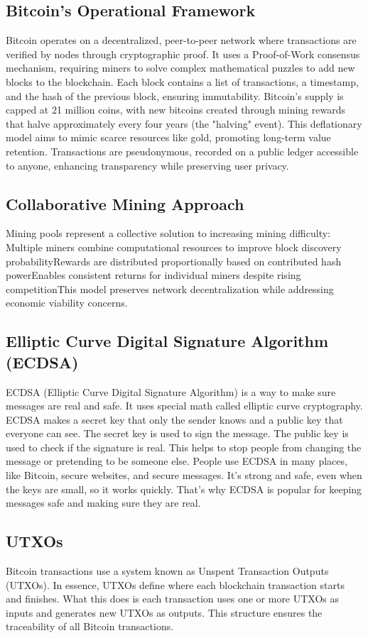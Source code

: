 \documentclass[12pt, a4paper]{article}
\begin{document}
\subsection{Bitcoin's Operational Framework}
Bitcoin operates on a decentralized, peer-to-peer network where transactions are verified by nodes through cryptographic proof. It uses a Proof-of-Work consensus mechanism, requiring miners to solve complex mathematical puzzles to add new blocks to the blockchain. Each block contains a list of transactions, a timestamp, and the hash of the previous block, ensuring immutability. Bitcoin's supply is capped at 21 million coins, with new bitcoins created through mining rewards that halve approximately every four years (the "halving" event). This deflationary model aims to mimic scarce resources like gold, promoting long-term value retention. Transactions are pseudonymous, recorded on a public ledger accessible to anyone, enhancing transparency while preserving user privacy.
\subsection{Collaborative Mining Approach}
Mining pools represent a collective solution to increasing mining difficulty:
Multiple miners combine computational resources to improve block discovery probabilityRewards are distributed proportionally based on contributed hash powerEnables consistent returns for individual miners despite rising competitionThis model preserves network decentralization while addressing economic viability concerns.
\subsection{Elliptic Curve Digital Signature Algorithm (ECDSA)}
ECDSA (Elliptic Curve Digital Signature Algorithm) is a way to make sure messages are real and safe. It uses special math called elliptic curve cryptography. ECDSA makes a secret key that only the sender knows and a public key that everyone can see. The secret key is used to sign the message. The public key is used to check if the signature is real. This helps to stop people from changing the message or pretending to be someone else. People use ECDSA in many places, like Bitcoin, secure websites, and secure messages. It’s strong and safe, even when the keys are small, so it works quickly. That’s why ECDSA is popular for keeping messages safe and making sure they are real.
\subsection{UTXOs}
Bitcoin transactions use a system known as Unspent Transaction Outputs (UTXOs). In
essence, UTXOs define where each blockchain transaction starts and finishes. What this
does is each transaction uses one or more UTXOs as inputs and generates new UTXOs
as outputs. This structure ensures the traceability of all Bitcoin transactions.
\end{document}
